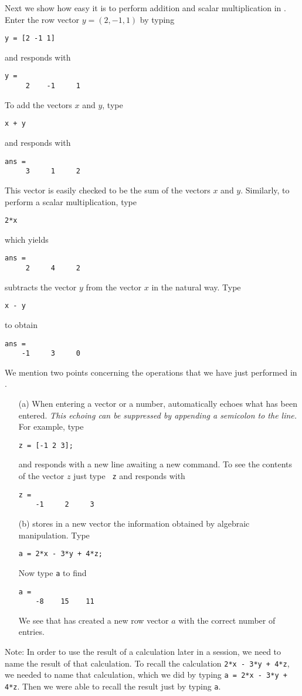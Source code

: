 \documentclass{ximera}
\begin{document}
Next we show how easy it is to perform addition and scalar
multiplication
in \Matlabp.  Enter the row vector $y=(2,-1,1)$ by typing
\begin{verbatim}
y = [2 -1 1]
\end{verbatim}
and \Matlab responds with
\begin{verbatim}
y =
     2    -1     1
\end{verbatim}
To add the vectors $x$ and $y$, type
\begin{verbatim}
x + y
\end{verbatim}
and \Matlab responds with
\begin{verbatim}
ans =
     3     1     2
\end{verbatim}
This vector is easily checked to be the sum of the vectors $x$
and $y$.  Similarly, to perform a scalar multiplication, type
\begin{verbatim}
2*x
\end{verbatim}
which yields
\begin{verbatim}
ans =
     2     4     2
\end{verbatim}
\Matlab subtracts the vector $y$ from the vector $x$ in the natural
way.  Type
\begin{verbatim}
x - y
\end{verbatim}
to obtain
\begin{verbatim}
ans =
    -1     3     0
\end{verbatim}

We mention two points concerning the operations that
we have just performed in \Matlabp.
\begin{enumerate}
\item[(a)] When entering a vector or a number, \Matlab
automatically echoes what has been entered.  {\em This echoing
can be suppressed by appending a semicolon to the line.\/} For
example, type
\begin{verbatim}
z = [-1 2 3];
\end{verbatim}
\index{\computer!;} and \Matlab responds with a new line awaiting a new
command.  To see the contents of the vector $z$ just type {\tt
z} and \Matlab responds with
\begin{verbatim}
z =
    -1     2     3
\end{verbatim}

\item[(b)] \Matlab stores in a new vector the information obtained by
algebraic manipulation.  Type
\begin{verbatim}
a = 2*x - 3*y + 4*z;
\end{verbatim}
Now type {\tt a} to find
\begin{verbatim}
a =
    -8    15    11
\end{verbatim}
We see that \Matlab has created a new row vector $a$ with the
correct number of entries.
\end{enumerate}
\noindent Note:  In order to use the result of a calculation later in a 
\Matlab session, we need to name the result of that calculation.  To recall 
the calculation {\tt 2*x - 3*y + 4*z}, we needed to name that calculation, 
which we did by typing {\tt a = 2*x - 3*y + 4*z}.  Then we were able to 
recall the result just by typing {\tt a}.
\end{document}
